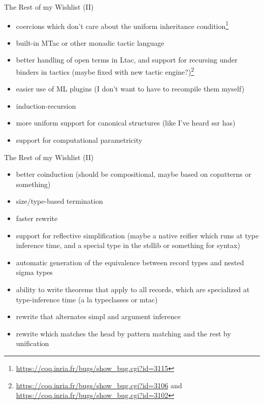 \documentclass{beamer}
\begin{document}
\begin{frame}{The Rest of my Wishlist (II)}
\begin{itemize}
  \item 
    coercions which don't care about the uniform inheritance condition\footnote{\url{https://coq.inria.fr/bugs/show\_bug.cgi?id=3115}}
  \item 
    built-in MTac or other monadic tactic language
  \item 
    better handling of open terms in Ltac, and support for recursing under binders in tactics (maybe fixed with new tactic engine?)\footnote{\url{https://coq.inria.fr/bugs/show\_bug.cgi?id=3106} and \url{https://coq.inria.fr/bugs/show\_bug.cgi?id=3102}}
  \item 
    easier use of ML plugins (I don't want to have to recompile them myself)
  \item 
    induction-recursion
  \item 
    more uniform support for canonical structures (like I've heard ssr has)
  \item 
    support for computational parametricity
\end{itemize}
\end{frame}

\begin{frame}{The Rest of my Wishlist (II)}
\begin{itemize}
  \item 
    better coinduction (should be compositional, maybe based on copatterns or something)
  \item 
    size/type-based termination
  \item 
    faster rewrite
  \item 
    support for reflective simplification (maybe a native reifier which runs at type inference time, and a special type in the stdlib or something for syntax)
  \item 
    automatic generation of the equivalence between record types and nested sigma types
  \item 
    ability to write theorems that apply to all records, which are specialized at type-inference time (a la typeclasses or mtac)
  \item 
    rewrite that alternates simpl and argument inference
  \item 
    rewrite which matches the head by pattern matching and the rest by unification
\end{itemize}
\end{frame}
\end{document}

